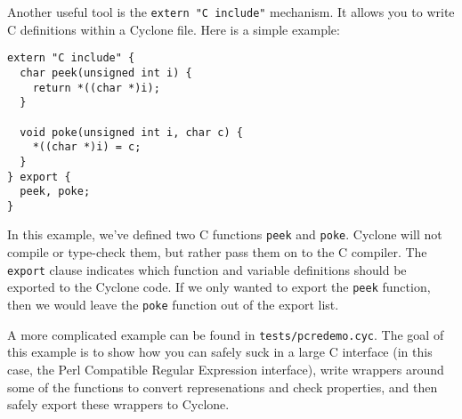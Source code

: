 Another useful tool is the \texttt{extern "C include"} mechanism.
It allows you to write C definitions within a Cyclone file.  Here
is a simple example:
\begin{verbatim}
extern "C include" {
  char peek(unsigned int i) {
    return *((char *)i);
  }

  void poke(unsigned int i, char c) {
    *((char *)i) = c;
  }
} export {
  peek, poke;
}
\end{verbatim}
In this example, we've defined two C functions \texttt{peek} and 
\texttt{poke}.  Cyclone will not compile or type-check them, but
rather pass them on to the C compiler.  The \texttt{export} clause
indicates which function and variable definitions should be 
exported to the Cyclone code.  If we only wanted to export the
\texttt{peek} function, then we would leave the \texttt{poke} function
out of the export list.

A more complicated example can be found in \texttt{tests/pcredemo.cyc}.
The goal of this example is to show how you can safely suck in
a large C interface (in this case, the Perl Compatible Regular Expression
interface), write wrappers around some of the functions to convert
represenations and check properties, and then safely export these
wrappers to Cyclone.  

